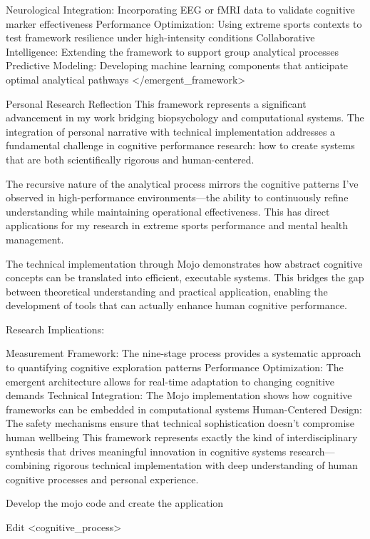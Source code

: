 Neurological Integration: Incorporating EEG or fMRI data to validate cognitive marker effectiveness
Performance Optimization: Using extreme sports contexts to test framework resilience under high-intensity conditions
Collaborative Intelligence: Extending the framework to support group analytical processes
Predictive Modeling: Developing machine learning components that anticipate optimal analytical pathways
</emergent_framework>

Personal Research Reflection
This framework represents a significant advancement in my work bridging biopsychology and computational systems. The integration of personal narrative with technical implementation addresses a fundamental challenge in cognitive performance research: how to create systems that are both scientifically rigorous and human-centered.

The recursive nature of the analytical process mirrors the cognitive patterns I've observed in high-performance environments—the ability to continuously refine understanding while maintaining operational effectiveness. This has direct applications for my research in extreme sports performance and mental health management.

The technical implementation through Mojo demonstrates how abstract cognitive concepts can be translated into efficient, executable systems. This bridges the gap between theoretical understanding and practical application, enabling the development of tools that can actually enhance human cognitive performance.

Research Implications:

Measurement Framework: The nine-stage process provides a systematic approach to quantifying cognitive exploration patterns
Performance Optimization: The emergent architecture allows for real-time adaptation to changing cognitive demands
Technical Integration: The Mojo implementation shows how cognitive frameworks can be embedded in computational systems
Human-Centered Design: The safety mechanisms ensure that technical sophistication doesn't compromise human wellbeing
This framework represents exactly the kind of interdisciplinary synthesis that drives meaningful innovation in cognitive systems research—combining rigorous technical implementation with deep understanding of human cognitive processes and personal experience.




Develop the mojo code and create the application

Edit
<cognitive_process>

